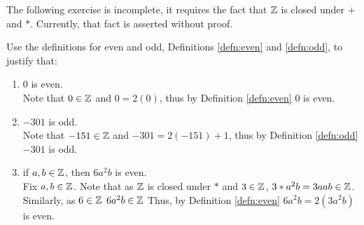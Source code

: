 \guard





The following exercise is incomplete, it requires the fact that $\mathbb{Z}$ is closed under $+$ and $*$.
Currently, that fact is asserted without proof.

\begin{exmp}
\label{exmp:evenOdd}
  Use the definitions for even and odd, Definitions \ref{defn:even} and \ref{defn:odd}, to justify that:
  \begin{enumerate}
    \item $0$ is even.\\
      Note that $0\in\mathbb{Z}$ and $0 = 2(0)$, thus by Definition \ref{defn:even} $0$ is even.
    \item $-301$ is odd.\\
      Note that $-151\in\mathbb{Z}$ and $-301=2(-151) + 1$, thus by Definition \ref{defn:odd} $-301$ is odd.
    \item if $a,b\in\mathbb{Z}$, then $6a^2b$ is even.\\
      Fix $a,b\in\mathbb{Z}$.
      Note that as $\mathbb{Z}$ is closed under $*$ and $3\in\mathbb{Z}$, $3*a^2b=3aab\in\mathbb{Z}$.
      Similarly, as $6\in\mathbb{Z}$ $6a^2b\in\mathbb{Z}$
      Thus, by Definition \ref{defn:even} $6a^2b=2(3a^2b)$ is even.
  \end{enumerate}
\end{exmp}

